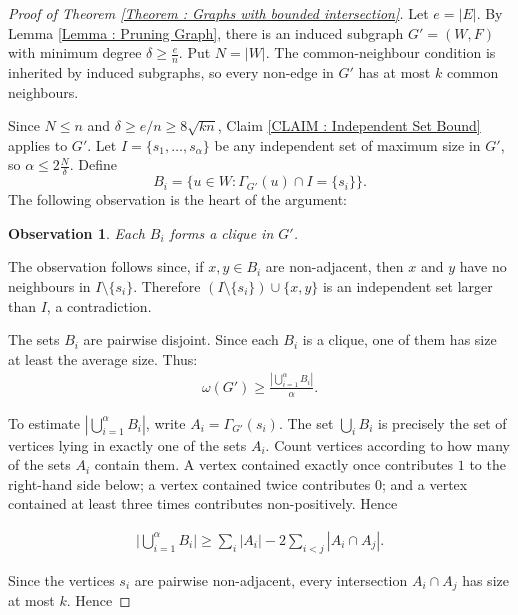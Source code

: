 \documentclass[fullpage,11pt]{article}
\theoremstyle{break}
\newtheorem{observation}[theorem]{Observation}
\theoremstyle{definition}
\theoremstyle{break}
\begin{document}
\begin{proof}[Proof of Theorem \ref{Theorem : Graphs with bounded intersection}]
    Let $e=|E|$. By Lemma \ref{Lemma : Pruning Graph}, there is an induced subgraph $G'=(W,F)$ with minimum degree $\delta\geq \frac{e}{n}$. Put $N=|W|$. The common-neighbour condition is inherited by induced subgraphs, so every non-edge in $G'$ has at most $k$ common neighbours.

    Since $N\leq n$ and $\delta\geq e/n\geq 8\sqrt{kn}$, Claim \ref{CLAIM : Independent Set Bound} applies to $G'$. Let $I=\{s_1,\ldots, s_{\alpha}\}$ be any independent set of maximum size in $G'$, so $\alpha \leq 2 \frac{N}{\delta }$. Define
    \[
        B_i=\{u\in W:\Gamma_{G'}(u)\cap I=\{s_i\}\}.
    \]
    The following observation is the heart of the argument:

    \begin{observation}
        Each $B_i$ forms a clique in $G'$.
    \end{observation}

    The observation follows since, if $x,y\in B_i$ are non-adjacent, then $x$ and $y$ have no neighbours in $I\setminus\{s_i\}$. Therefore $(I\setminus\{s_i\})\cup\{x,y\}$ is an independent set larger than $I$, a contradiction.

    The sets $B_i$ are pairwise disjoint. Since each $B_i$ is a clique, one of them has size at least the average size. Thus:
    \begin{align}
        \omega(G') \geq \frac{|\bigcup_{i=1}^{\alpha} B_i|}{\alpha}. \label{EQUATION : Bounding Cliques}
    \end{align}


    To estimate $|\bigcup_{i=1}^{\alpha} B_i|$, write $A_i=\Gamma_{G'}(s_i)$. The set $\bigcup_i B_i$ is precisely the set of vertices lying in exactly one of the sets $A_i$. Count vertices according to how many of the sets $A_i$ contain them. A vertex contained exactly once contributes $1$ to the right-hand side below; a vertex contained twice contributes $0$; and a vertex contained at least three times contributes non-positively. Hence

    \begin{align*}
        \bigg| \bigcup_{i=1}^{\alpha} B_i \bigg|
        \geq
        \sum_i |A_i|-2\sum_{i<j}|A_i\cap A_j| .
    \end{align*}

    Since the vertices $s_i$ are pairwise non-adjacent, every intersection $A_i\cap A_j$ has size at most $k$. Hence


\end{proof}
\end{document}
